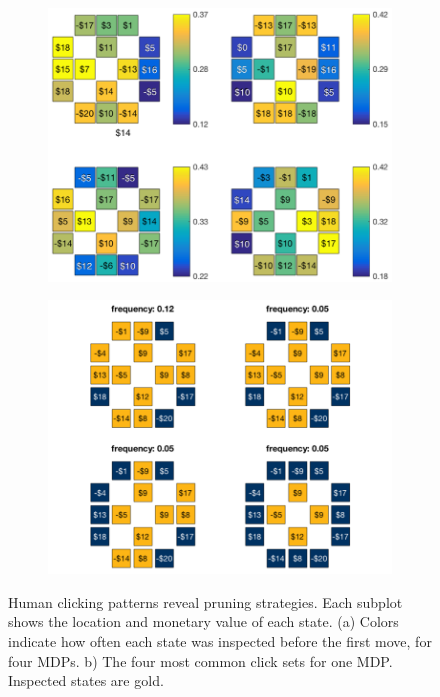 \documentclass[final]{beamer}
\newlength{\twocolwid}
\begin{document}
\begin{frame}[t, fragile]
\begin{columns}[t]
\begin{column}{\twocolwid}
  \begin{figure}
    \centering
    \begin{subfigure}{0.48\textwidth}
      \centering
      \label{fig:click_heat}
      \includegraphics[width=0.9\linewidth]{figs/click_locations_noFB_before1stFlight_small.png}
      \caption{}
    \end{subfigure}
    \begin{subfigure}{0.48\textwidth}
      \centering
      \label{fig:click_sets}
      \includegraphics[width=0.9\linewidth]{figs/click_sets_trial4_noFB_small.png}
      \caption{}
    \end{subfigure}
    \caption[first]{Human clicking patterns reveal pruning strategies. Each subplot shows the location and monetary value of each state. (a) Colors indicate how often each state was inspected before the first move, for four MDPs. b) The four most common click sets for one MDP. Inspected states are gold.}
  \end{figure}



\end{column}
\end{columns}
\end{frame}
\end{document}
